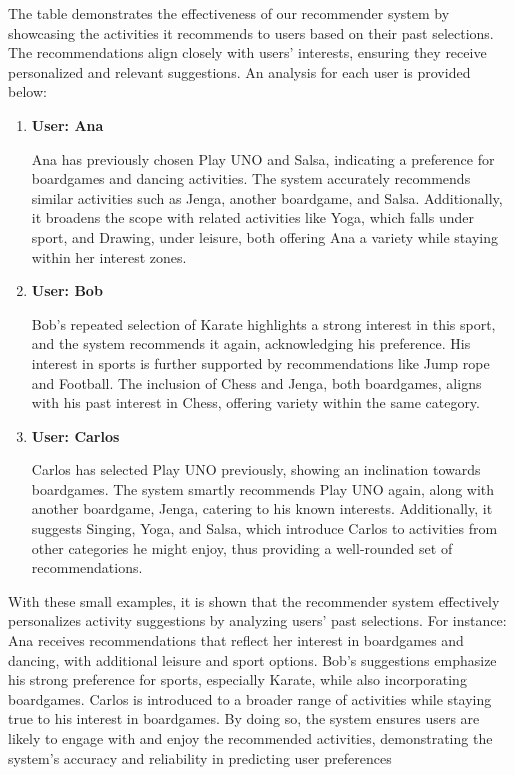 \documentclass[10pt,twocolumn,letterpaper]{article}
\begin{document}
The table demonstrates the effectiveness of our recommender system by showcasing the activities it recommends to users based on their past selections. The recommendations align closely with users' interests, ensuring they receive personalized and relevant suggestions. An analysis for each user is provided below:
\\
\begin{enumerate}
    \item \textbf{User: Ana}
    
    Ana has previously chosen Play UNO and Salsa, indicating a preference for boardgames and dancing activities. The system accurately recommends similar activities such as Jenga, another boardgame, and Salsa. Additionally, it broadens the scope with related activities like Yoga, which falls under sport, and Drawing, under leisure, both offering Ana a variety while staying within her interest zones.

    \item \textbf{User: Bob}
    
    Bob’s repeated selection of Karate highlights a strong interest in this sport, and the system recommends it again, acknowledging his preference. His interest in sports is further supported by recommendations like Jump rope and Football. The inclusion of Chess and Jenga, both boardgames, aligns with his past interest in Chess, offering variety within the same category.

    \item \textbf{User: Carlos}

    Carlos has selected Play UNO previously, showing an inclination towards boardgames. The system smartly recommends Play UNO again, along with another boardgame, Jenga, catering to his known interests. Additionally, it suggests Singing, Yoga, and Salsa, which introduce Carlos to activities from other categories he might enjoy, thus providing a well-rounded set of recommendations.
    
\end{enumerate}


With these small examples, it is shown that the recommender system effectively personalizes activity suggestions by analyzing users’ past selections. For instance: Ana receives recommendations that reflect her interest in boardgames and dancing, with additional leisure and sport options. Bob’s suggestions emphasize his strong preference for sports, especially Karate, while also incorporating boardgames. Carlos is introduced to a broader range of activities while staying true to his interest in boardgames.
By doing so, the system ensures users are likely to engage with and enjoy the recommended activities, demonstrating the system's accuracy and reliability in predicting user preferences
\end{document}

